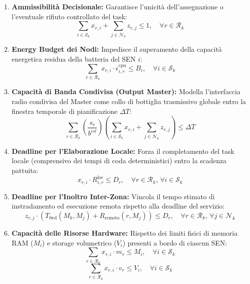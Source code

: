 \documentclass[12pt]{article}
\begin{document}
\begin{enumerate}
    \item \textbf{Ammissibilit\`a Decisionale:} Garantisce l'unicit\`a dell'assegnazione o l'eventuale rifiuto controllato del task:
    \begin{equation}
    \sum_{i \in \mathcal{S}_k} x_{r,i} + \sum_{j \in \mathcal{N}_k} z_{r,j} \leq 1, \quad \forall r \in \mathcal{R}_k
    \end{equation}

    \item \textbf{Energy Budget dei Nodi:} Impedisce il superamento della capacit\`a energetica residua della batteria del SEN $i$:
    \begin{equation}
    \sum_{r \in \mathcal{R}_k} x_{r,i} \cdot \epsilon_{i,r}^{\text{cpu}} \leq B_i, \quad \forall i \in \mathcal{S}_k
    \end{equation}

    \item \textbf{Capacit\`a di Banda Condivisa (Output Master):} Modella l'interfaccia radio condivisa del Master come collo di bottiglia trasmissivo globale entro la finestra temporale di pianificazione $\Delta T$:
    \begin{equation}
    \sum_{r \in \mathcal{R}_k} \left( \frac{s_r}{b^{isl}} \right) \left( \sum_{i \in \mathcal{S}_k} x_{r,i} + \sum_{j \in \mathcal{N}_k} z_{r,j} \right) \leq \Delta T
    \end{equation}

    \item \textbf{Deadline per l'Elaborazione Locale:} Forza il completamento del task locale (comprensivo dei tempi di coda deterministici) entro la scadenza pattuita:
    \begin{equation}
    x_{r,i} \cdot R_{i,r}^{\text{loc}} \leq D_r, \quad \forall r \in \mathcal{R}_k, \, \forall i \in \mathcal{S}_k
    \end{equation}

    \item \textbf{Deadline per l'Inoltro Inter-Zona:} Vincola il tempo stimato di instradamento ed esecuzione remota rispetto alla deadline del servizio:
    \begin{equation}
    z_{r,j} \cdot \left( T_{\text{fwd}}(M_k, M_j) + R_{\text{remoto}}(r, M_j) \right) \leq D_r, \quad \forall r \in \mathcal{R}_k, \, \forall j \in \mathcal{N}_k
    \end{equation}

    \item \textbf{Capacit\`a delle Risorse Hardware:} Rispetto dei limiti fisici di memoria RAM ($M_i$) e storage volumetrico ($V_i$) presenti a bordo di ciascun SEN:
    \begin{equation}
    \sum_{r \in \mathcal{R}_k} x_{r,i} \cdot m_r \leq M_i, \quad \forall i \in \mathcal{S}_k
    \end{equation}
    \begin{equation}
    \sum_{r \in \mathcal{R}_k} x_{r,i} \cdot v_r \leq V_i, \quad \forall i \in \mathcal{S}_k
    \end{equation}
\end{enumerate}
\end{document}

